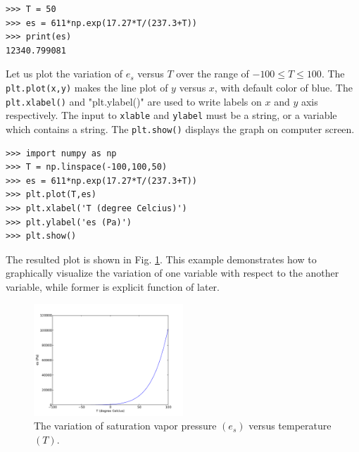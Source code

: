 \documentclass[10pt]{book}
\begin{document}
{\beforeverb
\begin{verbatim}
>>> T = 50
>>> es = 611*np.exp(17.27*T/(237.3+T))
>>> print(es)
12340.799081
\end{verbatim}
\afterverb
{}

Let us plot the variation of $e_s$ versus $T$ over the range of $-100 \leq T \leq 100$. The \verb"plt.plot(x,y)" makes the line plot of $y$ versus $x$, with default color of blue. The \verb"plt.xlabel()" and \value"plt.ylabel()" are used to write labels on $x$ and $y$ axis respectively. The input to \verb"xlable" and \verb"ylabel" must be a string, or a variable which contains a string. The \verb"plt.show()" displays the graph on computer screen. 
\beforeverb
\begin{verbatim}
>>> import numpy as np
>>> T = np.linspace(-100,100,50)
>>> es = 611*np.exp(17.27*T/(237.3+T))
>>> plt.plot(T,es)
>>> plt.xlabel('T (degree Celcius)')
>>> plt.ylabel('es (Pa)')
>>> plt.show()
\end{verbatim}
\afterverb
The resulted plot is shown in Fig. \ref{fig:es_t}. This example demonstrates how to graphically visualize the variation of one variable with respect to the another variable, while former is explicit function of later.

\beforefig
\begin{figure}[h!]
  \centering
    \includegraphics[width=0.5\textwidth]{images/es_t.pdf}
  \caption{The variation of saturation vapor pressure $(e_s)$ versus temperature $(T)$. }
  \label{fig:es_t}
\end{figure}
\afterfig

}
\end{document}
